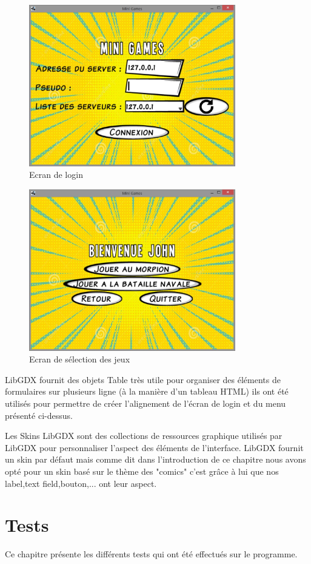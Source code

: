 \documentclass{report}
\begin{document}
\begin{figure}[H]
	\centering\includegraphics[width=9cm]{loginScreen}
	\caption{Ecran de login}
	\label{Ecran de login}
\end{figure}

\begin{figure}[H]
	\centering\includegraphics[width=9cm]{menuJeux}
	\caption{Ecran de sélection des jeux}
	\label{Ecran de selection}
\end{figure}

LibGDX fournit des objets Table très utile pour organiser des éléments de formulaires sur plusieurs ligne
(à la manière d'un tableau HTML) ils ont été utilisés pour permettre de créer l'alignement de l'écran de login et du menu
présenté ci-dessus.

Les Skins LibGDX sont des collections de ressources graphique utilisés par LibGDX pour personnaliser l'aspect des éléments
de l'interface. LibGDX fournit un skin par défaut mais comme dit dans l'introduction de ce chapitre nous avons opté pour un skin
basé sur le thème des "comics" c'est grâce à lui que nos label,text field,bouton,... ont leur aspect.

\chapter{Tests}
Ce chapitre présente les différents tests qui ont été effectués sur le programme.
\end{document}
